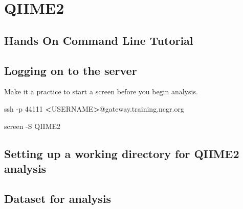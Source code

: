 \documentclass[
]{book}
\newenvironment{Shaded}{\begin{snugshade}}{\end{snugshade}}
\newcommand{\AttributeTok}[1]{\textcolor[rgb]{0.77,0.63,0.00}{#1}}
\newcommand{\BuiltInTok}[1]{#1}
\newcommand{\ExtensionTok}[1]{#1}
\newcommand{\FunctionTok}[1]{\textcolor[rgb]{0.00,0.00,0.00}{#1}}
\newcommand{\NormalTok}[1]{#1}
\newcommand{\OperatorTok}[1]{\textcolor[rgb]{0.81,0.36,0.00}{\textbf{#1}}}
\newcommand{\VariableTok}[1]{\textcolor[rgb]{0.00,0.00,0.00}{#1}}
\begin{document}
\hypertarget{qiime2}{%
\chapter{QIIME2}\label{qiime2}}

\hypertarget{hands-on-command-line-tutorial}{%
\section{Hands On Command Line Tutorial}\label{hands-on-command-line-tutorial}}

\hypertarget{logging-on-to-the-server}{%
\section{Logging on to the server}\label{logging-on-to-the-server}}

Make it a practice to start a screen before you begin analysis.

\begin{Shaded}
\begin{Highlighting}[]
\FunctionTok{ssh} \AttributeTok{{-}p}\NormalTok{ 44111 }\OperatorTok{\textless{}}\NormalTok{USERNAME}\OperatorTok{\textgreater{}}\NormalTok{@gateway.training.ncgr.org}

\ExtensionTok{screen} \AttributeTok{{-}S}\NormalTok{ QIIME2}
\end{Highlighting}
\end{Shaded}

\hypertarget{setting-up-a-working-directory-for-qiime2-analysis}{%
\section{Setting up a working directory for QIIME2 analysis}\label{setting-up-a-working-directory-for-qiime2-analysis}}

\begin{Shaded}
\end{Shaded}

\hypertarget{dataset-for-analysis}{%
\section{Dataset for analysis}\label{dataset-for-analysis}}
\end{document}
